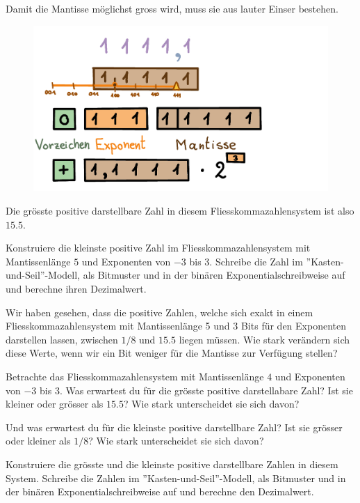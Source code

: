 \begin{beispiel}
Damit die Mantisse möglichst gross wird, muss sie aus lauter Einser bestehen.
\begin{figure}[H]
\centering
\includegraphics[width=0.85\linewidth]{Pictures/groessteZahl3.png}
\end{figure}

Die grösste positive darstellbare Zahl in diesem Fliesskommazahlensystem ist also \(15.5\).
\end{beispiel}

\begin{aufgabe}\label{kleinsteZahl-5-3}
Konstruiere die kleinste positive Zahl im Fliesskommazahlensystem mit Mantissenlänge \(5\) und Exponenten von \(-3\) bis \(3\). Schreibe die Zahl im ''Kasten-und-Seil''-Modell, als Bitmuster und in der binären Exponentialschreibweise auf und berechne ihren Dezimalwert.
\end{aufgabe}

Wir haben gesehen, dass die positive Zahlen, welche sich exakt in einem Fliesskommazahlensystem mit Mantissenlänge 5 und 3 Bits für den Exponenten darstellen lassen, zwischen \(1/8\) und \(15.5\) liegen müssen. Wie stark verändern sich diese Werte, wenn wir ein Bit weniger für die Mantisse zur Verfügung stellen?

\begin{aufgabe}\label{groesste-kleinste-4-3}
Betrachte das Fliesskommazahlensystem mit Mantissenlänge \(4\) und Exponenten von \(-3\) bis \(3\). Was erwartest du für die grösste positive darstellabare Zahl? Ist sie kleiner oder grösser als \(15.5\)? Wie stark unterscheidet sie sich davon?

Und was erwartest du für die kleinste positive darstellbare Zahl? Ist sie grösser oder kleiner als \(1/8\)? Wie stark unterscheidet sie sich davon?

Konstruiere die grösste und die kleinste positive darstellbare Zahlen in diesem System.  Schreibe die Zahlen im ''Kasten-und-Seil''-Modell, als Bitmuster und in der binären Exponentialschreibweise auf und berechne den Dezimalwert. 
\end{aufgabe}

